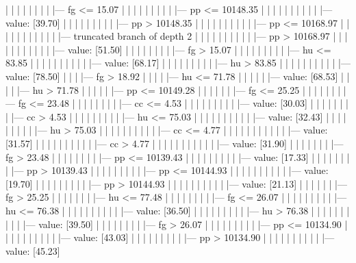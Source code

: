 \documentclass[UTF8, a4paper]{ctexart}
\begin{document}
|   |   |   |   |   |   |   |   |--- fg <= 15.07
|   |   |   |   |   |   |   |   |   |--- pp <= 10148.35
|   |   |   |   |   |   |   |   |   |   |--- value: [39.70]
|   |   |   |   |   |   |   |   |   |--- pp >  10148.35
|   |   |   |   |   |   |   |   |   |   |--- pp <= 10168.97
|   |   |   |   |   |   |   |   |   |   |   |--- truncated branch of depth 2
|   |   |   |   |   |   |   |   |   |   |--- pp >  10168.97
|   |   |   |   |   |   |   |   |   |   |   |--- value: [51.50]
|   |   |   |   |   |   |   |   |--- fg >  15.07
|   |   |   |   |   |   |   |   |   |--- hu <= 83.85
|   |   |   |   |   |   |   |   |   |   |--- value: [68.17]
|   |   |   |   |   |   |   |   |   |--- hu >  83.85
|   |   |   |   |   |   |   |   |   |   |--- value: [78.50]
|   |   |   |--- fg >  18.92
|   |   |   |   |--- hu <= 71.78
|   |   |   |   |   |--- value: [68.53]
|   |   |   |   |--- hu >  71.78
|   |   |   |   |   |--- pp <= 10149.28
|   |   |   |   |   |   |--- fg <= 25.25
|   |   |   |   |   |   |   |--- fg <= 23.48
|   |   |   |   |   |   |   |   |--- cc <= 4.53
|   |   |   |   |   |   |   |   |   |--- value: [30.03]
|   |   |   |   |   |   |   |   |--- cc >  4.53
|   |   |   |   |   |   |   |   |   |--- hu <= 75.03
|   |   |   |   |   |   |   |   |   |   |--- value: [32.43]
|   |   |   |   |   |   |   |   |   |--- hu >  75.03
|   |   |   |   |   |   |   |   |   |   |--- cc <= 4.77
|   |   |   |   |   |   |   |   |   |   |   |--- value: [31.57]
|   |   |   |   |   |   |   |   |   |   |--- cc >  4.77
|   |   |   |   |   |   |   |   |   |   |   |--- value: [31.90]
|   |   |   |   |   |   |   |--- fg >  23.48
|   |   |   |   |   |   |   |   |--- pp <= 10139.43
|   |   |   |   |   |   |   |   |   |--- value: [17.33]
|   |   |   |   |   |   |   |   |--- pp >  10139.43
|   |   |   |   |   |   |   |   |   |--- pp <= 10144.93
|   |   |   |   |   |   |   |   |   |   |--- value: [19.70]
|   |   |   |   |   |   |   |   |   |--- pp >  10144.93
|   |   |   |   |   |   |   |   |   |   |--- value: [21.13]
|   |   |   |   |   |   |--- fg >  25.25
|   |   |   |   |   |   |   |--- hu <= 77.48
|   |   |   |   |   |   |   |   |--- fg <= 26.07
|   |   |   |   |   |   |   |   |   |--- hu <= 76.38
|   |   |   |   |   |   |   |   |   |   |--- value: [36.50]
|   |   |   |   |   |   |   |   |   |--- hu >  76.38
|   |   |   |   |   |   |   |   |   |   |--- value: [39.50]
|   |   |   |   |   |   |   |   |--- fg >  26.07
|   |   |   |   |   |   |   |   |   |--- pp <= 10134.90
|   |   |   |   |   |   |   |   |   |   |--- value: [43.03]
|   |   |   |   |   |   |   |   |   |--- pp >  10134.90
|   |   |   |   |   |   |   |   |   |   |--- value: [45.23]
\end{document}
